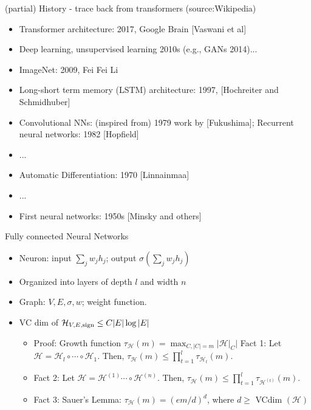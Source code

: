\documentclass[final]{beamer}
\begin{document}
\begin{frame}{(partial) History - trace back from transformers (source:Wikipedia)}
	\begin{itemize}
		\item Transformer architecture: 2017, Google Brain [Vaswani et al]
		\item Deep learning, unsupervised learning 2010s (e.g., GANs 2014)...
		\item ImageNet: 2009, Fei Fei Li 
		\item Long-short term memory (LSTM) architecture: 1997, [Hochreiter and Schmidhuber]
		\item Convolutional NNs: (inspired from) 1979 work by [Fukushima];  Recurrent neural networks: 1982 [Hopfield]
		\item ...
		\item Automatic Differentiation: 1970 [Linnainmaa]
		\item ...
		\item First neural networks: 1950s [Minsky and others]
	\end{itemize}
\end{frame}

\begin{frame}{Fully connected Neural Networks}
	\begin{itemize}
		\item Neuron: input $\sum_j w_j h_j$; output $\sigma(\sum_j w_j h_j)$
		\item Organized into layers of depth $l$ and width $n$
		
		\item Graph: $V, E, \sigma, w$; weight function.
		\pause
	\item VC dim of $\mathcal{H}_{V, E, {\rm sign}} \leq C |E|\log |E|$
		\pause
		\begin{itemize}
		\item Proof: Growth function $\tau_{\mathcal{H}}(m) = \max_{C, |C|=m} |\mathcal{H}|_C| $
			\pause Fact 1: Let $\mathcal{H} =\mathcal{H}_l \circ \cdots \circ \mathcal{H}_1.$ Then,  $\tau_{\mathcal{H}}(m) \leq \prod_{t=1}^l \tau_{\mathcal{H}_t}(m)$.
			\pause 
			\item
			Fact 2: Let $\mathcal{H} =\mathcal{H}^{(1)}  \cdots \circ \mathcal{H}^{(n)}.$ Then,  $\tau_{\mathcal{H}}(m) \leq \prod_{t=1}^l \tau_{\mathcal{H}^{(t)}}(m)$.
			\pause 
		\item Fact 3: Sauer's Lemma: $\tau_{\mathcal{H}}(m) = (em/d)^d$, where $d \geq $ VCdim $(\mathcal{H})$ 
		\end{itemize}
	\end{itemize}

\end{frame}
\end{document}
